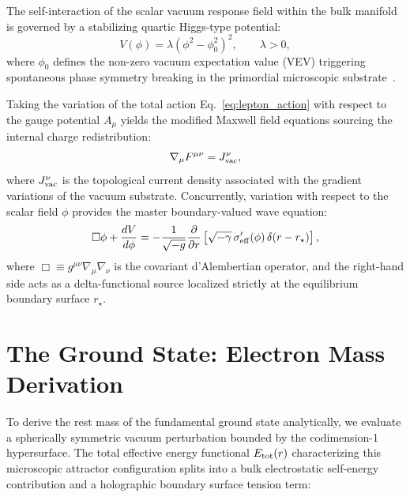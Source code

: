 \documentclass[
  reprint,
  aps,
  prd,
  twocolumn,
  superscriptaddress,
  nofootinbib,
  floatfix
]{revtex4-2}
\begin{document}
The self-interaction of the scalar vacuum response field 
within the bulk manifold is governed by a stabilizing 
quartic Higgs-type potential:
\begin{equation}
\label{eq:quartic_lepton_pot}
V(\phi) = \lambda \left( \phi^2 - \phi_0^2 \right)^2, 
\qquad \lambda > 0,
\end{equation}
where $\phi_0$ defines the non-zero vacuum expectation 
value (VEV) triggering spontaneous phase symmetry breaking 
in the primordial microscopic substrate~\cite{tHooft1974}.

Taking the variation of the total action 
Eq.~\eqref{eq:lepton_action} with respect to the gauge 
potential $A_\mu$ yields the modified Maxwell field 
equations sourcing the internal charge redistribution:
\begin{equation}
\label{eq:maxwell_vacuum}
\nabla_\mu F^{\mu\nu} = J^{\nu}_{\rm vac},
\end{equation}
where $J^{\nu}_{\rm vac}$ is the topological current density 
associated with the gradient variations of the vacuum 
substrate. Concurrently, variation with respect to the 
scalar field $\phi$ provides the master boundary-valued 
wave equation:
\begin{equation}
\label{eq:scalar_lepton_box}
\Box\phi + \frac{dV}{d\phi} = -\frac{1}{\sqrt{-g}}
\frac{\partial}{\partial r} \left[ \sqrt{-\gamma}\,
\sigma_{\rm eff}'(\phi)\,\delta(r - r_\star) \right],
\end{equation}
where $\Box \equiv g^{\mu\nu}\nabla_\mu\nabla_\nu$ is the 
covariant d'Alembertian operator, and the right-hand side 
acts as a delta-functional source localized strictly at 
the equilibrium boundary surface $r_\star$.


\section{The Ground State: Electron Mass Derivation}
\label{sec:electron_mass}

To derive the rest mass of the fundamental ground state 
analytically, we evaluate a spherically symmetric vacuum 
perturbation bounded by the codimension-1 hypersurface. 
The total effective energy functional $E_{\rm tot}(r)$ 
characterizing this microscopic attractor configuration 
splits into a bulk electrostatic self-energy contribution 
and a holographic boundary surface tension term:
\end{document}
